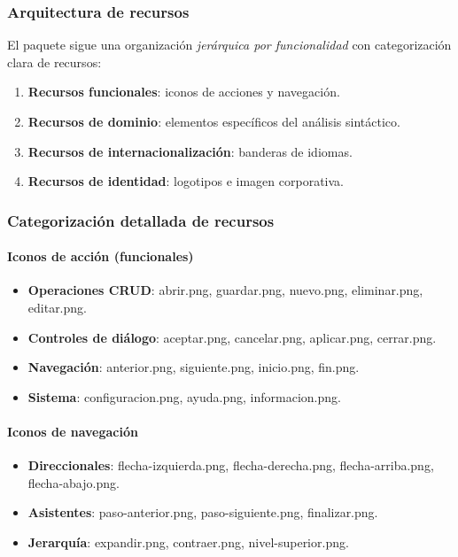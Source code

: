 \subsubsection{Arquitectura de recursos}

El paquete sigue una organización \textit{jerárquica por funcionalidad} con categorización clara de recursos:

\begin{enumerate}
    \item \textbf{Recursos funcionales}: iconos de acciones y navegación.
    \item \textbf{Recursos de dominio}: elementos específicos del análisis sintáctico.
    \item \textbf{Recursos de internacionalización}: banderas de idiomas.
    \item \textbf{Recursos de identidad}: logotipos e imagen corporativa.
\end{enumerate}

\subsubsection{Categorización detallada de recursos}

\paragraph{Iconos de acción (funcionales)}
\begin{itemize}
    \item \textbf{Operaciones CRUD}: abrir.png, guardar.png, nuevo.png, eliminar.png, editar.png.
    \item \textbf{Controles de diálogo}: aceptar.png, cancelar.png, aplicar.png, cerrar.png.
    \item \textbf{Navegación}: anterior.png, siguiente.png, inicio.png, fin.png.
    \item \textbf{Sistema}: configuracion.png, ayuda.png, informacion.png.
\end{itemize}

\paragraph{Iconos de navegación}
\begin{itemize}
    \item \textbf{Direccionales}: flecha-izquierda.png, flecha-derecha.png, flecha-arriba.png, flecha-abajo.png.
    \item \textbf{Asistentes}: paso-anterior.png, paso-siguiente.png, finalizar.png.
    \item \textbf{Jerarquía}: expandir.png, contraer.png, nivel-superior.png.
\end{itemize}

